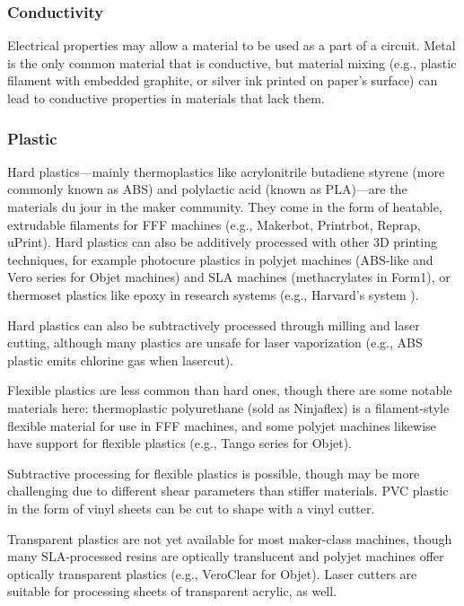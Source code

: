 \subsubsection{Conductivity}

Electrical properties may allow a material to be used as a part of a circuit. Metal is the only common material that is conductive, but material mixing (e.g., plastic filament with embedded graphite, or silver ink printed on paper's surface) can lead to conductive properties in materials that lack them.

\subsubsection{Plastic}

Hard plastics---mainly thermoplastics like acrylonitrile butadiene styrene (more commonly known as ABS) and polylactic acid (known as PLA)---are the materials du jour in the maker community. They come in the form of heatable, extrudable filaments for FFF machines (e.g., Makerbot, Printrbot, Reprap, uPrint). Hard plastics can also be additively processed with other 3D printing techniques, for example photocure plastics in polyjet machines (ABS-like and Vero series for Objet machines) and SLA machines (methacrylates in Form1), or thermoset plastics like epoxy in research systems (e.g., Harvard's system \cite{compton-epoxy}).

Hard plastics can also be subtractively processed through milling and laser cutting, although many plastics are unsafe for laser vaporization (e.g., ABS plastic emits chlorine gas when lasercut).

Flexible plastics are less common than hard ones, though there are some notable materials here: thermoplastic polyurethane (sold as Ninjaflex) is a filament-style flexible material for use in FFF machines, and some polyjet machines likewise have support for flexible plastics (e.g., Tango series for Objet).

Subtractive processing for flexible plastics is possible, though may be more challenging due to different shear parameters than stiffer materials. PVC plastic in the form of vinyl sheets can be cut to shape with a vinyl cutter.

Transparent plastics are not yet available for most maker-class machines, though many SLA-processed resins are optically translucent and polyjet machines offer optically transparent plastics (e.g., VeroClear for Objet). Laser cutters are suitable for processing sheets of transparent acrylic, as well.

